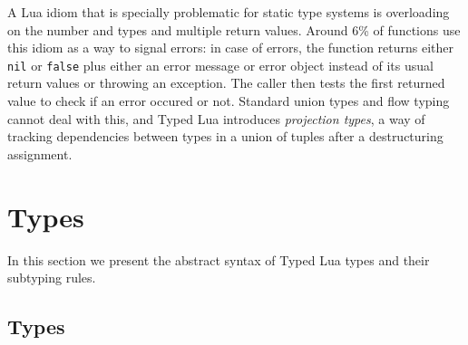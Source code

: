 \documentclass{sigplanconf}
\begin{document}
A Lua idiom that is specially problematic for static type
systems is overloading on the number and types and
multiple return values. Around 6\% of functions use
this idiom as a way to signal errors: in case of errors,
the function returns either {\tt nil} or {\tt false} plus
either an error message or error object instead of its usual
return values or throwing an exception. The caller then
tests the first returned value to check if an error occured
or not. Standard union types and flow typing cannot deal
with this, and Typed Lua introduces {\em projection types},
a way of tracking dependencies between types in a union of
tuples after a destructuring assignment.

\section{Types}
\label{sec:types}

In this section we present the abstract syntax of Typed Lua types
and their subtyping rules.



\subsection{Types}
\end{document}
